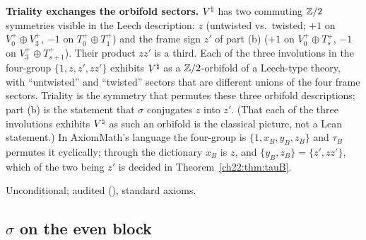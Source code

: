 \begin{physics}
\textbf{Triality exchanges the orbifold sectors.}  ${V^{\natural}}$ has two commuting ${\mathbb{Z}}/2$ symmetries visible in the
Leech description: $z$ (untwisted vs.\ twisted; $+1$ on $V_0^+\oplus V_3^+$, $-1$ on $T_0^+\oplus T_1^+$) and the frame sign
$z'$ of part (b) ($+1$ on $V_0^+\oplus T_s^+$, $-1$ on $V_3^+\oplus T_{s+1}^+$).  Their product $zz'$ is a third.  Each of the three involutions in the four-group
$\{1,z,z',zz'\}$ exhibits ${V^{\natural}}$ as a ${\mathbb{Z}}/2$-orbifold of a Leech-type theory, with ``untwisted'' and ``twisted'' sectors
that are different unions of the four frame sectors.  Triality is the symmetry that permutes these three orbifold
descriptions; part (b) is the statement that $\sigma$ conjugates $z$ into $z'$.  (That each of the three involutions exhibits ${V^{\natural}}$
as such an orbifold is the classical picture, not a Lean statement.)  In AxiomMath's language the four-group is
$\{1,x_B,y_B,z_B\}$ and $\tau_B$ permutes it cyclically; through the dictionary $x_B$ is $z$, and $\{y_B,z_B\}=\{z',zz'\}$,
which of the two being $z'$ is decided in Theorem~\ref{ch22:thm:tauB}.
\end{physics}
\begin{status}Unconditional; audited (), standard axioms.\end{status}

\subsection{\texorpdfstring{$\sigma$}{sigma} on the even block}

